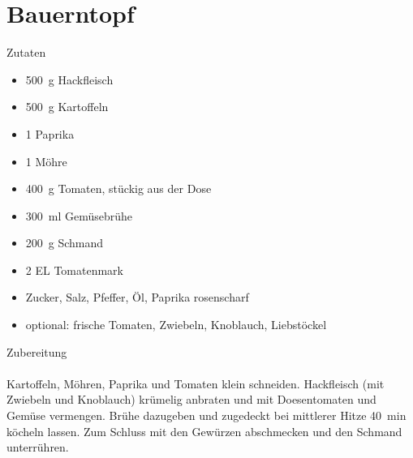 \section*{Bauerntopf}
\ihead{}\ohead{}
\cfoot{}
{\Large Zutaten}
\begin{multicols}{2}
\begin{itemize}
    \item \SI{500}{g} Hackfleisch
    \item \SI{500}{g} Kartoffeln
    \item \num{1} Paprika
    \item \num{1} Möhre
    \item \SI{400}{g} Tomaten, stückig aus der Dose
    \item \SI{300}{ml} Gemüsebrühe
    \item \SI{200}{g} Schmand
    \item \num{2} EL Tomatenmark
    \item Zucker, Salz, Pfeffer, Öl, Paprika rosenscharf
    \item optional: frische Tomaten, Zwiebeln, Knoblauch, Liebstöckel
\end{itemize}
\end{multicols}
\noindent
{\Large Zubereitung}\\
\\
Kartoffeln, Möhren, Paprika und Tomaten klein schneiden.
Hackfleisch (mit Zwiebeln und Knoblauch) krümelig anbraten und mit Doesentomaten und Gemüse vermengen.
Brühe dazugeben und zugedeckt bei mittlerer Hitze \SI{40}{min} köcheln lassen. 
Zum Schluss mit den Gewürzen abschmecken und den Schmand unterrühren. 